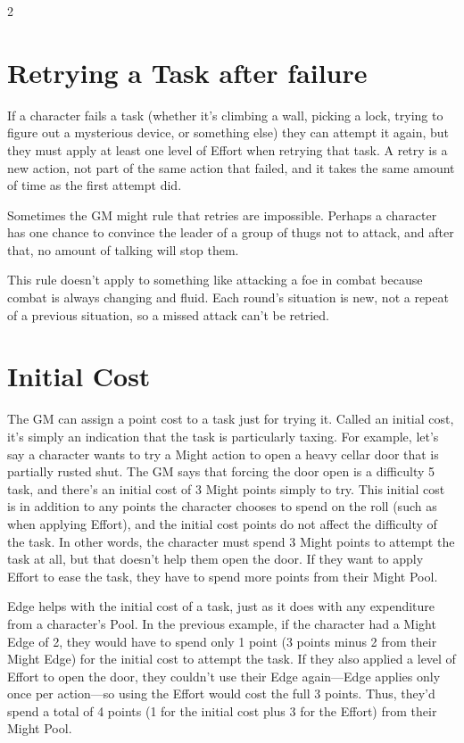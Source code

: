 \begin{multicols}{2}
\section{Retrying a Task after failure}
 
If a character fails a task (whether it’s climbing a wall, picking a lock, trying to figure out a mysterious device, or something else) they can attempt it again, but they must apply at least one level of Effort when retrying that task. A retry is a new action, not part of the same action that failed, and it takes the same amount of time as the first attempt did.

Sometimes the GM might rule that retries are impossible. Perhaps a character has one chance to convince the leader of a group of thugs not to attack, and after that, no amount of talking will stop them.

This rule doesn’t apply to something like attacking a foe in combat because combat is always changing and fluid. Each round’s situation is new, not a repeat of a previous situation, so a missed attack can’t be retried.

\section{Initial Cost}

The GM can assign a point cost to a task just for trying it. Called an initial cost, it’s simply an indication that the task is particularly taxing. For example, let’s say a character wants to try a Might action to open a heavy cellar door that is partially rusted shut. The GM says that forcing the door open is a difficulty 5 task, and there’s an initial cost of 3 Might points simply to try. This initial cost is in addition to any points the character chooses to spend on the roll (such as when applying Effort), and the initial cost points do not affect the difficulty of the task. In other words, the character must spend 3 Might points to attempt the task at all, but that doesn’t help them open the door. If they want to apply Effort to ease the task, they have to spend more points from their Might Pool.

Edge helps with the initial cost of a task, just as it does with any expenditure from a character’s Pool. In the previous example, if the character had a Might Edge of 2, they would have to spend only 1 point (3 points minus 2 from their Might Edge) for the initial cost to attempt the task. If they also applied a level of Effort to open the door, they couldn’t use their Edge again—Edge applies only once per action—so using the Effort would cost the full 3 points. Thus, they’d spend a total of 4 points (1 for the initial cost plus 3 for the Effort) from their Might Pool.


\end{multicols}
